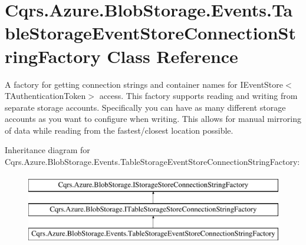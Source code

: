 \hypertarget{classCqrs_1_1Azure_1_1BlobStorage_1_1Events_1_1TableStorageEventStoreConnectionStringFactory}{}\section{Cqrs.\+Azure.\+Blob\+Storage.\+Events.\+Table\+Storage\+Event\+Store\+Connection\+String\+Factory Class Reference}
\label{classCqrs_1_1Azure_1_1BlobStorage_1_1Events_1_1TableStorageEventStoreConnectionStringFactory}


A factory for getting connection strings and container names for I\+Event\+Store$<$\+T\+Authentication\+Token$>$ access. This factory supports reading and writing from separate storage accounts. Specifically you can have as many different storage accounts as you want to configure when writing. This allows for manual mirroring of data while reading from the fastest/closest location possible.  


Inheritance diagram for Cqrs.\+Azure.\+Blob\+Storage.\+Events.\+Table\+Storage\+Event\+Store\+Connection\+String\+Factory\+:\begin{figure}[H]
\begin{center}
\leavevmode
\includegraphics[height=3.000000cm]{classCqrs_1_1Azure_1_1BlobStorage_1_1Events_1_1TableStorageEventStoreConnectionStringFactory}
\end{center}
\end{figure}
